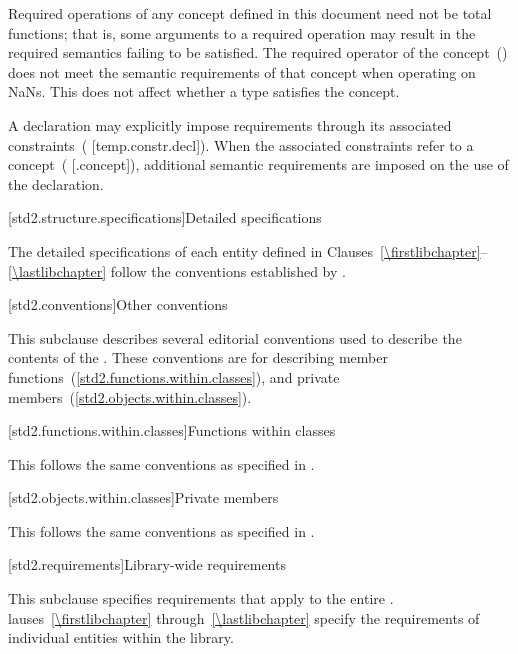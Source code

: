 \pnum
Required operations of any concept defined in this document need not be
total functions; that is, some arguments to a required operation may
result in the required semantics failing to be satisfied. \enterexample
The required \tcode{<} operator of the 
concept~() does not meet the
semantic requirements of that concept when operating on NaNs.\exitexample
This does not affect whether a type satisfies the concept.

\pnum
A declaration may explicitly impose requirements through its associated
constraints~( [temp.\brk{}constr.\brk{}decl]). When the associated constraints
refer to a concept~( [.concept]), additional semantic requirements are
imposed on the use of the declaration.

[std2.structure.specifications]{Detailed specifications}

\pnum
The detailed specifications of each entity defined in
Clauses~\ref{\firstlibchapter}--\ref{\lastlibchapter} follow the conventions
established by .

[std2.conventions]{Other conventions}
%

\pnum
This subclause describes several editorial conventions used to describe the contents
of the . These conventions are for describing
member functions~(\ref{std2.functions.within.classes}),
and private members~(\ref{std2.objects.within.classes}).

[std2.functions.within.classes]{Functions within classes}

\pnum
This  follows the same conventions as specified in .

[std2.objects.within.classes]{Private members}

\pnum
This  follows the same conventions as specified in .

[std2.requirements]{Library-wide requirements}

\pnum
This subclause specifies requirements that apply to the entire .
lauses~\ref{\firstlibchapter} through~\ref{\lastlibchapter}
specify the requirements of individual entities within the library.

